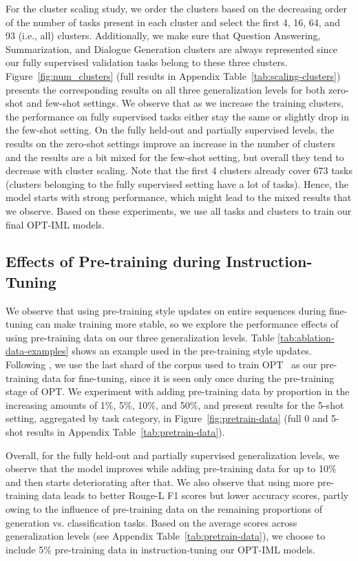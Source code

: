 For the cluster scaling study, we order the clusters based on the decreasing order of the number of tasks present in each cluster and select the first 4, 16, 64, and 93 (i.e., all) clusters. Additionally, we make sure that Question Answering, Summarization, and Dialogue Generation clusters are always represented since our fully supervised validation tasks belong to these three clusters. Figure~\ref{fig:num_clusters} (full results in Appendix Table~\ref{tab:scaling-clusters}) presents the corresponding results on all three generalization levels for both zero-shot and few-shot settings. We observe that as we increase the training clusters, the performance on fully supervised tasks either stay the same or slightly drop in the few-shot setting. On the fully held-out and partially supervised levels, the results on the zero-shot settings improve an increase in the number of clusters and the results are a bit mixed for the few-shot setting, but overall they tend to decrease with cluster scaling. Note that the first 4 clusters already cover 673 tasks (clusters belonging to the fully supervised setting have a lot of tasks). Hence, the model starts with strong performance, which might lead to the mixed results that we observe. Based on these experiments, we use all tasks and clusters to train our final OPT-IML models.

\subsection{Effects of Pre-training during Instruction-Tuning}
\label{subsec:pretrain-data}

We observe that using pre-training style updates on entire sequences during fine-tuning can make training more stable, so we explore the performance effects of using pre-training data on our three generalization levels. Table \ref{tab:ablation-data-examples} shows an example used in the pre-training style updates. Following \cite{shuster2022blenderbot}, we use the last shard of the corpus used to train OPT~\citep{zhang2022opt} as our pre-training data for fine-tuning, since it is seen only once during the pre-training stage of OPT. We experiment with adding pre-training data by proportion in the increasing amounts of 1\%, 5\%, 10\%, and 50\%, and present results for the 5-shot setting, aggregated by task category, in Figure~\ref{fig:pretrain-data} (full 0 and 5-shot results in Appendix Table~\ref{tab:pretrain-data}).  

Overall, for the fully held-out and partially supervised generalization levels, we observe that the model improves while adding pre-training data for up to 10\% and then starts deteriorating after that. We also observe that using more pre-training data leads to better Rouge-L F1 scores but lower accuracy scores, partly owing to the influence of pre-training data on the remaining proportions of generation vs. classification tasks. Based on the average scores across generalization levels (see Appendix Table~\ref{tab:pretrain-data}), we choose to include 5\% pre-training data in instruction-tuning our OPT-IML models.

